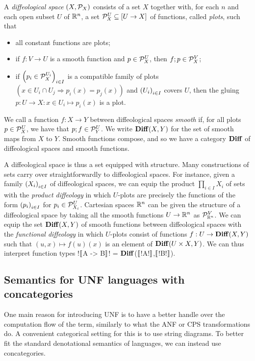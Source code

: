 \begin{definition}
	A \emph{diffeological space} $(X,\plots{X})$ consists of a set $X$ together with, for each $n$ and each open subset $U$ of $\RR^n$,  a set $\plots{X}^U\subseteq [U\to X]$ of functions, called \emph{plots}, such that
	\begin{itemize}
	 	\item all constant functions are plots;
	 	\item if $f:V\to U$ is a smooth function and $p\in\plots{X}^U$, then $f;p\in\plots{X}^V$;
     \item if $\seq[i\in I]{p_i\in\plots{X}^{U_i}}$ is a compatible family of plots $(x\in U_i\cap U_j\Rightarrow p_i(x)=p_j(x))$
     and $\seq[i\in I]{U_i}$ covers $U$,
     then the gluing $p:U\to X:x\in U_i\mapsto p_i(x)$ is a plot.
	 \end{itemize} 
\end{definition}
We call a function $f:X\to Y$ between diffeological spaces \emph{smooth} if, for all plots
$p\in\plots{X}^U$, we have that $p;f\in \plots{Y}^U$. We write $\Diff(X,Y)$ for the set of smooth maps from $X$ to $Y$. 
Smooth functions compose, and so we have a category $\Diff$ of diffeological spaces and smooth functions.

A diffeological space is thus a set equipped with structure.
Many constructions of sets carry over straightforwardly to diffeological spaces.
For instance, given a family $\seq[i\in I]{X_i}$ of diffeological spaces,
we can equip the product $\prod_{i\in I}X_i$ of sets with the
\emph{product diffeology} in which $U$-plots are precisely the functions
of the form $\seq[i\in I]{p_i}$ for $p_i\in\plots{X_i}^U$.  
Cartesian spaces $\RR^n$ can be given the structure of a diffeological space by taking all the
smooth functions $U\to \RR^n$ as $\plots{\RR^n}^V$. We can equip the set $\Diff(X,Y)$ of smooth functions between diffeological spaces with the \emph{functional diffeology}
in which $U$-plots consist of functions $f:U\to \Diff(X,Y)$ such that 
$(u,x)\mapsto f(u)(x)$ is an element of $\Diff(U\times X, Y)$.
We can thus interpret function types !$\seml$A -> B$\semr$! = $\Diff$($\seml$!A!$\semr$,$\seml$!B!$\semr$).

\subsection{Semantics for UNF languages with concategories} %
\label{sub:Semantics for UNF using concategories}

One main reason for introducing UNF is to have a better handle over
the computation flow of the term, similarly to what the ANF or CPS transformations do.
A convenient categorical setting for this is to use string diagrams.
To better fit the standard denotational semantics of languages, 
we can instead use concategories. 

